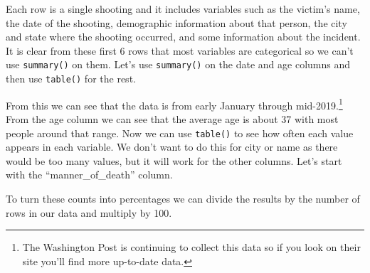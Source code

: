 \documentclass[
]{krantz}
\makeatletter
\newenvironment{Shaded}{\begin{snugshade}}{\end{snugshade}}
\newcommand{\CommentTok}[1]{\textcolor[rgb]{0.37,0.37,0.37}{\textit{#1}}}
\newcommand{\FunctionTok}[1]{\textcolor[rgb]{0,0,0}{#1}}
\newcommand{\NormalTok}[1]{#1}
\newcommand{\SpecialCharTok}[1]{\textcolor[rgb]{0,0,0}{#1}}
\newenvironment{kframe}{%
\medskip{}
\setlength{\fboxsep}{.8em}
 \def\at@end@of@kframe{}%
 \ifinner\ifhmode%
  \def\at@end@of@kframe{\end{minipage}}%
  \begin{minipage}{\columnwidth}%
 \fi\fi%
 \def\FrameCommand##1{\hskip\@totalleftmargin \hskip-\fboxsep
 \colorbox{shadecolor}{##1}\hskip-\fboxsep
     \hskip-\linewidth \hskip-\@totalleftmargin \hskip\columnwidth}%
 \MakeFramed {\advance\hsize-\width
   \@totalleftmargin\z@ \linewidth\hsize
   \@setminipage}}%
 {\par\unskip\endMakeFramed%
 \at@end@of@kframe}
\renewenvironment{Shaded}{\begin{kframe}}{\end{kframe}}
\makeatother
\begin{document}
Each row is a single shooting and it includes variables such
as the victim's name, the date of the shooting, demographic
information about that person, the city and state where the
shooting occurred, and some information about the incident.
It is clear from these first 6 rows that most variables are
categorical so we can't use \texttt{summary()} on them.
Let's use \texttt{summary()} on the date and age columns and
then use \texttt{table()} for the rest.

\begin{Shaded}
\end{Shaded}

From this we can see that the data is from early January
through mid-2019.\footnote{The Washington Post is continuing
  to collect this data so if you look on their site you'll
  find more up-to-date data.} From the age column we can see
that the average age is about 37 with most people around
that range. Now we can use \texttt{table()} to see how often
each value appears in each variable. We don't want to do
this for city or name as there would be too many values, but
it will work for the other columns. Let's start with the
``manner\_of\_death'' column.

\begin{Shaded}
\end{Shaded}

To turn these counts into percentages we can divide the
results by the number of rows in our data and multiply by
100.
\end{document}

